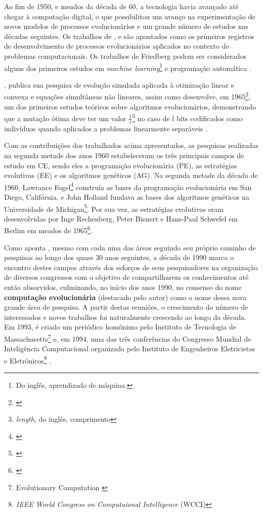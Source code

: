 Ao fim de 1950, e meados da década de 60, a tecnologia havia avançado até chegar à computação digital, o que possibilitou um avanço na experimentação de novos modelos de processos evolucionários e um grande número de estudos nas décadas seguintes. Os trabalhos de \cite{learning_machine_1958}, \cite{Friedberg1959ALM} e \cite{bremermann_optimization_1962} são apontados como os primeiros registros de desenvolvimento de processos evolucionários aplicados no contexto de problemas computacionais. Os trabalhos de Friedberg podem ser considerados alguns dos primeiros estudos em \textit{machine learning}\footnote{Do inglês, aprendizado de máquina.} e programação automática .

\cite{bremermann_optimization_1962}, publica sua pesquisa de evolução simulada aplicada à otimização linear e convexa e equações simultâneas não lineares, assim como desenvolve, em 1965\footnote{\cite{search_evolution_biophysics_1965}}, um dos primeiros estudos teóricos sobre algoritmos evolucionários, demonstrando que a mutação ótima deve ter um valor $\frac{1}{l}$\footnote{\textit{length}, do inglês, comprimento} no caso de $l$ bits codificados como indivíduos quando aplicados a problemas linearmente separáveis .

Com as contribuições dos trabalhados acima apresentados, as pesquisas realizadas na segunda metade dos anos 1960 estabeleceram os três principais campos de estudo em CE, sendo eles a programação evolucionária (PE), as estratégias evolutivas (EE) e os algoritmos genéticos (AG). Na segunda metade da década de 1960, Lawrance Fogel\footnote{\cite{Fogel1966ArtificialIT}} construía as bases da programação evolucionária em San Diego, Califórnia, e John Holland fundava as bases dos algoritmos genéticos na Universidade de Michigan\footnote{\cite{holland_1962}}. Por sua vez, as estratégias evolutivas eram desenvolvidas por Inge Rechenberg, Peter Bienert e Hans-Paul Schwefel em Berlim em meados de 1965\footnote{\cite{rechenberg_cybernetic_1965}}.

Como aponta \cite{back_handbook_1997}, mesmo com cada uma das áreas seguindo seu próprio caminho de pesquisas ao longo dos quase 30 anos seguintes, a década de 1990 marca o encontro destes campos através dos esforços de seus pesquisadores na organização de diversos congressos com o objetivo de compartilharem os conhecimentos até então absorvidos, culminando, no início dos anos 1990, no consenso do nome \textbf{computação evolucionária} (destacado pelo autor) como o nome dessa nova grande área de pesquisa. A partir destas reuniões, o crescimento do número de interessados e novos trabalhos foi naturalmente crescendo ao longo da década. Em 1993, é criado um periódico homônimo pelo Instituto de Tecnologia de Massachusetts\footnote{Evolutionary Computation \citeyearpar{noauthor_editorial_1993}} e, em 1994, uma das três conferências do Congresso Mundial de Inteligência Computacional organizado pelo Instituto de Engenheiros Eletricistas e Eletrônicos\footnote{\textit{IEEE World Congress on Computaional Intelligence} (WCCI)} .

